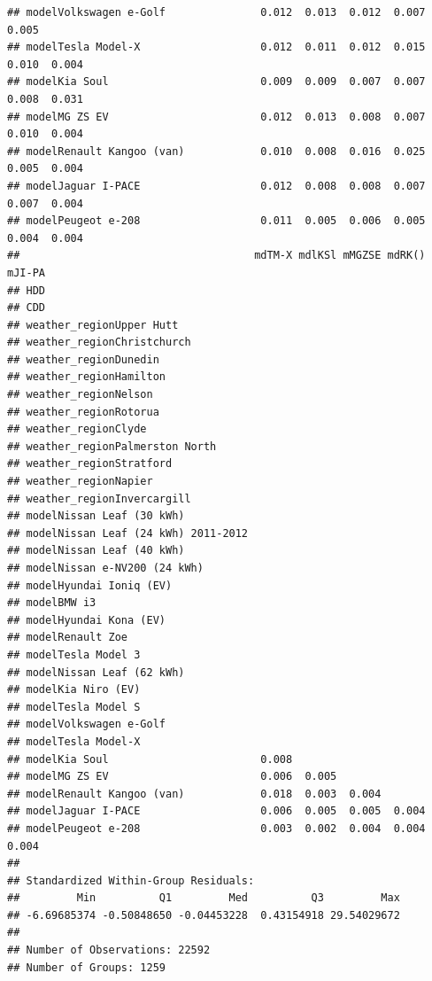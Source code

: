 \documentclass[
]{article}
\begin{document}
\begin{verbatim}
## modelVolkswagen e-Golf               0.012  0.013  0.012  0.007  0.005       
## modelTesla Model-X                   0.012  0.011  0.012  0.015  0.010  0.004
## modelKia Soul                        0.009  0.009  0.007  0.007  0.008  0.031
## modelMG ZS EV                        0.012  0.013  0.008  0.007  0.010  0.004
## modelRenault Kangoo (van)            0.010  0.008  0.016  0.025  0.005  0.004
## modelJaguar I-PACE                   0.012  0.008  0.008  0.007  0.007  0.004
## modelPeugeot e-208                   0.011  0.005  0.006  0.005  0.004  0.004
##                                     mdTM-X mdlKSl mMGZSE mdRK() mJI-PA
## HDD                                                                   
## CDD                                                                   
## weather_regionUpper Hutt                                              
## weather_regionChristchurch                                            
## weather_regionDunedin                                                 
## weather_regionHamilton                                                
## weather_regionNelson                                                  
## weather_regionRotorua                                                 
## weather_regionClyde                                                   
## weather_regionPalmerston North                                        
## weather_regionStratford                                               
## weather_regionNapier                                                  
## weather_regionInvercargill                                            
## modelNissan Leaf (30 kWh)                                             
## modelNissan Leaf (24 kWh) 2011-2012                                   
## modelNissan Leaf (40 kWh)                                             
## modelNissan e-NV200 (24 kWh)                                          
## modelHyundai Ioniq (EV)                                               
## modelBMW i3                                                           
## modelHyundai Kona (EV)                                                
## modelRenault Zoe                                                      
## modelTesla Model 3                                                    
## modelNissan Leaf (62 kWh)                                             
## modelKia Niro (EV)                                                    
## modelTesla Model S                                                    
## modelVolkswagen e-Golf                                                
## modelTesla Model-X                                                    
## modelKia Soul                        0.008                            
## modelMG ZS EV                        0.006  0.005                     
## modelRenault Kangoo (van)            0.018  0.003  0.004              
## modelJaguar I-PACE                   0.006  0.005  0.005  0.004       
## modelPeugeot e-208                   0.003  0.002  0.004  0.004  0.004
## 
## Standardized Within-Group Residuals:
##         Min          Q1         Med          Q3         Max 
## -6.69685374 -0.50848650 -0.04453228  0.43154918 29.54029672 
## 
## Number of Observations: 22592
## Number of Groups: 1259
\end{verbatim}
\end{document}
